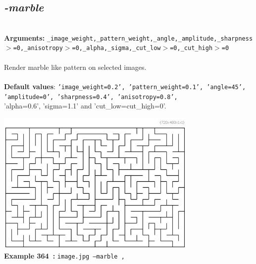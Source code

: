 \documentclass[a4paper,11pt,twoside]{book}
\begin{document}
\subsection{\emph{-marble} }\vspace*{-0.5em}
~\\\textbf{Arguments: } 
{\small \texttt{\_image\_weight,\_pattern\_weight,\_angle,\_amplitude,\_sharpness$>$=0,\_anisotropy$>$=0,\_alpha,\_sigma,\_cut\_low$>$=0,\_cut\_high$>$=0}}\\~\\
Render marble like pattern on selected images.
~\\~\\\textbf{Default values}: {\small \texttt{'image\_weight=0.2', 'pattern\_weight=0.1', 'angle=45', 'amplitude=0', 'sharpness=0.4', 'anisotropy=0.8',}}
~\\'alpha=0.6', 'sigma=1.1' and 'cut\_low=cut\_high=0'.
\begin{center}\includegraphics[keepaspectratio=true,height=7cm,width=\textwidth]{img/gmic_def364.jpg}\\
{\footnotesize \textbf{Example 364~:} \texttt{image.jpg --marble ,}}
\end{center}
\end{document}

